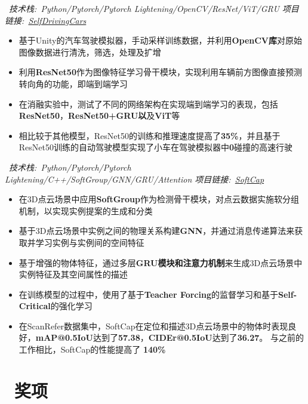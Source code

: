 \documentclass{resume}
\begin{document}
\ \textit{技术栈:\ Python/Pytorch/Pytorch Lightening/OpenCV/ResNet/ViT/GRU \hfill 项目链接:\ \href{https://github.com/LuckyMax0722/SelfDrivingCars}{SelfDrivingCars}}
\begin{itemize}
  \item 基于Unity的汽车驾驶模拟器，手动采样训练数据，并利用\textbf{OpenCV库}对原始图像数据进行清洗，筛选，处理及扩增
  \item 利用\textbf{ResNet50}作为图像特征学习骨干模块，实现利用车辆前方图像直接预测转向角的功能，即端到端学习
  \item 在消融实验中，测试了不同的网络架构在实现端到端学习的表现，包括\textbf{ResNet50}，\textbf{ResNet50+GRU以}及\textbf{ViT}等
  \item 相比较于其他模型，ResNet50的训练和推理速度提高了\textbf{35\%}，并且基于ResNet50训练的自动驾驶模型实现了小车在驾驶模拟器中\textbf{0}碰撞的高速行驶
\end{itemize}
\vspace{0.1cm}

\ \textit{技术栈:\ Python/Pytorch/Pytorch Lightening/C++/SoftGroup/GNN/GRU/Attention \hfill 项目链接:\ \href{https://github.com/LuckyMax0722/SoftCap}{SoftCap}}
\begin{itemize}
  \item 在3D点云场景中应用\textbf{SoftGroup}作为检测骨干模块，对点云数据实施软分组机制，以实现实例提案的生成和分类
  \item 基于3D点云场景中实例之间的物理关系构建\textbf{GNN}，并通过消息传递算法来获取并学习实例与实例间的空间特征
  \item 基于增强的物体特征，通过多层\textbf{GRU模块和注意力机制}来生成3D点云场景中实例特征及其空间属性的描述
  \item 在训练模型的过程中，使用了基于\textbf{Teacher Forcing}的监督学习和基于\textbf{Self-Critical}的强化学习
  \item 在ScanRefer数据集中，SoftCap在定位和描述3D点云场景中的物体时表现良好，\textbf{mAP@0.5IoU}达到了\textbf{57.38}，\textbf{CIDEr@0.5IoU}达到了\textbf{36.27}。 与之前的工作相比，SoftCap的性能提高了 \textbf{140\%}
\end{itemize}
\vspace{0.1cm}

\section{\faStar\ 奖项}
\end{document}
